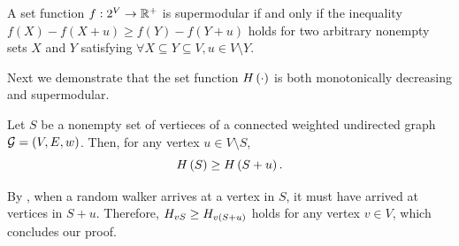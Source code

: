 \documentclass[10pt,twocolumn,twoside]{IEEEtran}
\begin{document}
\begin{definition}[Supermodularity]
    A set function \(f:2^{V}\to\mathbb{R}^+\) is  supermodular if and only if the inequality \(f(X)-f(X+u)\ge f(Y)-f(Y+u)\) holds for two arbitrary nonempty sets \(X\) and \(Y\) satisfying \(\forall X\subseteq Y\subseteq V, u\in V\setminus Y\).
\end{definition}

Next we demonstrate that the set function \(H\left(\cdot\right)\) is both monotonically decreasing and supermodular.

\begin{theorem}\label{thm:mono}
    Let \(S\) be a nonempty set of vertieces of a connected weighted undirected graph \(\mathcal{G}=(V,E,w)\). Then, for any vertex \(u\in V\setminus S\),
    \begin{equation*}
        H\left(S\right)\ge H\left(S+u\right).
    \end{equation*}
\end{theorem}
\begin{IEEEproof}
    By , when a random walker arrives at a vertex in \(S\), it must have arrived at vertices in \(S+u\). Therefore, \(H_{vS}\ge H_{v\left( S+u \right)}\) holds for any vertex \(v\in V\), which concludes our proof.
\end{IEEEproof}
\end{document}
